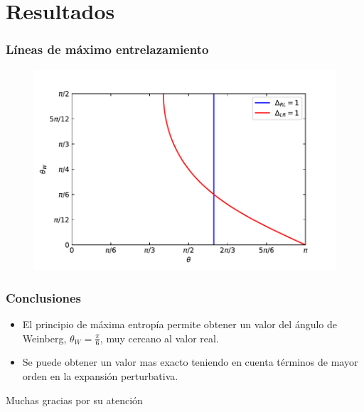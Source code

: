 \documentclass{beamer}
\begin{document}
\section{Resultados}
\begin{frame}
\frametitle{Líneas de máximo entrelazamiento}
\begin{figure}[h]
	\centering
	\includegraphics[width=0.85\linewidth]{concurrence.pdf}	
\end{figure}
\end{frame}
\begin{frame}
\frametitle{Conclusiones}
\begin{itemize}
	\item El principio de máxima entropía permite obtener un valor del ángulo de Weinberg, \(\theta_W=\frac{\pi}{6} \), muy cercano al valor real.
	\item Se puede obtener un valor mas exacto teniendo en cuenta términos de mayor orden en la expansión perturbativa.	
	
	
\end{itemize}
\end{frame}


\begin{frame}
\Huge{\centerline{Muchas gracias por su atención}}
\end{frame}

\end{document}
